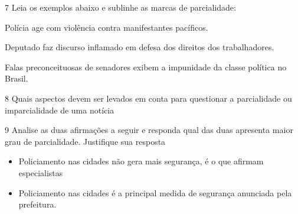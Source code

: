 {{

\num{7} Leia os exemplos abaixo e sublinhe as marcas de parcialidade:

\begin{escolha}

  \item Polícia age com violência contra manifestantes pacíficos.

  \item Deputado faz discurso inflamado em defesa dos direitos dos
trabalhadores.

  \item Falas preconceituosas de senadores exibem a impunidade da classe
política no Brasil.

\end{escolha}


\num{8} Quais aspectos devem ser levados em conta para questionar a
parcialidade ou imparcialidade de uma notícia


\num{9} Analise as duas afirmações a seguir e responda qual das duas apresenta
maior grau de parcialidade. Justifique sua resposta

\begin{itemize}
 
 \item Policiamento nas cidades não gera mais segurança, é o que afirmam
especialistas

  \item Policiamento nas cidades é a principal medida de segurança anunciada pela prefeitura.

\end{itemize}

}}
